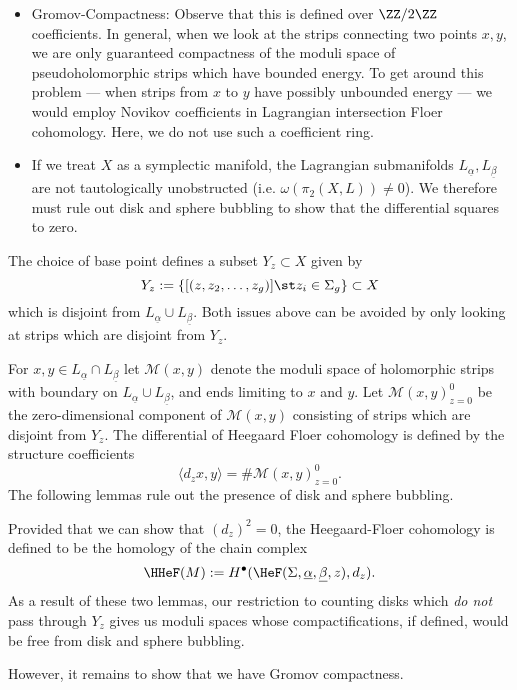 \begin{itemize}
    \item Gromov-Compactness: Observe that this is defined over $\ZZ/2\ZZ$ coefficients. In general, when we look at the strips connecting two points $x, y$, we are only guaranteed compactness of the moduli space of pseudoholomorphic strips which have bounded energy. To get around this problem --- when strips from $x$ to $y$ have possibly unbounded energy --- we would employ Novikov coefficients in Lagrangian intersection Floer cohomology. Here, we do not use such a coefficient ring. 
    \item  If we treat $X$ as a symplectic manifold, the Lagrangian submanifolds $L_{\underline \alpha}, L_{\underline \beta}$ are not tautologically unobstructed (i.e. $\omega(\pi_2(X, L))\neq 0$). We therefore must rule out disk and sphere bubbling to show that the differential squares to zero.
\end{itemize}

The choice of base point defines a subset $Y_z\subset X$ given by  
\[ Y_z:=\{[(z, z_2, \ldots, z_g)] \st z_i\in \Sigma_g\} \subset X\]
which is disjoint from $L_{\underline \alpha}\cup L_{\underline \beta}$. Both issues above can be avoided by only looking at strips which are disjoint from $Y_z$.

For $x, y\in L_{\underline \alpha}\cap L_{\underline \beta}$ let $\mathcal M(x, y)$ denote the moduli space of holomorphic strips with boundary on $L_{\underline \alpha}\cup L_{\underline \beta}$, and ends limiting to $x$ and $y$. Let $\mathcal M(x, y)_{z=0}^0$ be the zero-dimensional component of $\mathcal M(x, y)$ consisting of strips which are disjoint from $Y_z$. The differential of Heegaard Floer cohomology is defined by the structure coefficients
\[\langle d_zx , y \rangle = \#\mathcal M(x, y)_{z=0}^0.\]
The following lemmas rule out the presence of disk and sphere bubbling.


Provided that we can show that $(d_z)^2=0$, the Heegaard-Floer cohomology is defined to be the homology of the chain complex
\[\HHeF(M):= H^\bullet(\HeF(\Sigma, \underline \alpha, \underline \beta ,z), d_z).\]
As a result of these two lemmas, our restriction to counting disks which \emph{do not} pass through $Y_z$ gives us moduli spaces whose compactifications, if defined, would be free from disk and sphere bubbling. 

However, it remains to show that we have Gromov compactness.

